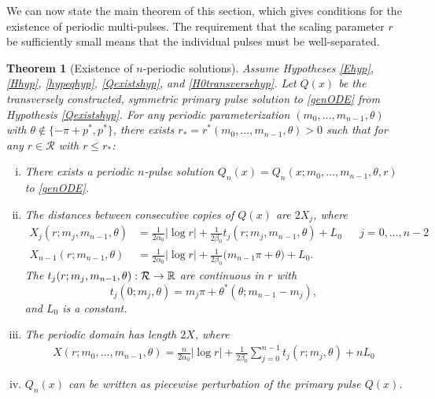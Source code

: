 \documentclass[11pt,reqno]{amsart}
\theoremstyle{plain}
\newtheorem{theorem}{Theorem}
\theoremstyle{definition}
\theoremstyle{remark}
\begin{document}
We can now state the main theorem of this section, which gives conditions for the existence of periodic multi-pulses. The requirement that the scaling parameter $r$ be sufficiently small means that the individual pulses must be well-separated.

\begin{theorem}[Existence of $n$-periodic solutions]\label{perexist}
Assume Hypotheses \ref{Ehyp}, \ref{Hhyp}, \ref{hypeqhyp}, \ref{Qexistshyp}, and \ref{H0transversehyp}. Let $Q(x)$ be the transversely constructed, symmetric primary pulse solution to \eqref{genODE} from Hypothesis \ref{Qexistshyp}. For any periodic parameterization $(m_0, \dots, m_{n-1}, \theta)$ with $\theta \notin \{-\pi + p^*, p^* \}$, there exists $r_* = r^*(m_0, \dots, m_{n-1}, \theta) > 0$ such that for any $r \in \mathcal{R}$ with $r \leq r_*$:
\begin{enumerate}[(i)]
	\item There exists a periodic $n$-pulse solution $Q_n(x) = Q_n(x; m_0, \dots, m_{n-1}, \theta, r)$ to \eqref{genODE}.

	\item The distances between consecutive copies of $Q(x)$ are $2X_j$, where
	\begin{align}\label{Xj}
		X_j(r; m_j, m_{n-1},\theta) &= \frac{1}{2 \alpha_0} |\log r| + \frac{1}{2\beta_0} t_j(r; m_j,m_{n-1}, \theta) + L_0 && j = 0, \dots, n-2 \\
		X_{n-1}(r; m_{n-1}, \theta) &= \frac{1}{2 \alpha_0} |\log r| + \frac{1}{2 \beta_0}\big( m_{n-1}\pi + \theta \big) + L_0.
	\end{align}
	The $t_j(r; m_j, m_{n-1}, \theta): \mathcal{R} \rightarrow \mathbb{R}$ are continuous in $r$ with 
	\[
	t_j(0; m_j, \theta) = m_j \pi + \theta^*(\theta; m_{n-1} - m_j),
	\]
	and $L_0$ is a constant.

	\item The periodic domain has length $2X$, where
	\begin{align}\label{Xdomain}
	X(r; m_0, \dots, m_{n-1}, \theta) = \frac{n}{2\alpha_0} |\log r| + \frac{1}{2\beta_0} \sum_{j=0}^{n-1} t_j(r; m_j, \theta) + n L_0
	\end{align}

	\item $Q_n(x)$ can be written as piecewise perturbation of the primary pulse $Q(x)$. 
\end{enumerate}
\end{theorem}
\end{document}

